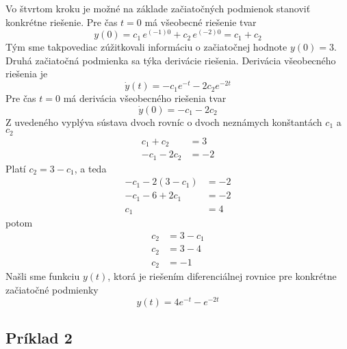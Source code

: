 \documentclass[a4paper, 10pt, ]{article}
\begin{document}
Vo štvrtom kroku je možné na základe začiatočných podmienok stanoviť konkrétne riešenie. Pre čas $t = 0$ má všeobecné riešenie tvar
\begin{equation}
    y(0)  = c_1 \, e^{(-1) 0} + c_2 \, e^{(-2) 0} = c_1 + c_2
\end{equation}
Tým sme takpovediac zúžitkovali informáciu o začiatočnej hodnote $y(0) = 3$. Druhá začiatočná podmienka sa týka derivácie riešenia. Derivácia všeobecného riešenia je
\begin{equation}
    \dot y(t) = - c_1 e^{-t} - 2 c_2 e^{-2t}
\end{equation}
Pre čas $t = 0$ má derivácia všeobecného riešenia tvar
\begin{equation}
    \dot y(0)  = - c_1 - 2 c_2
\end{equation}
Z uvedeného vyplýva sústava dvoch rovníc o dvoch neznámych konštantách $c_1$ a $c_2$
\begin{subequations}
    \begin{align}
        c_1 + c_2 &= 3 \\
        - c_1 - 2 c_2 &= -2
    \end{align}
\end{subequations}
Platí $c_2 = 3-c_1$, a teda
\begin{subequations}
    \begin{align}
        - c_1 - 2 (3 - c_1) &= -2 \\
        - c_1 - 6 + 2 c_1 &= -2 \\
        c_1 &= 4
    \end{align}
\end{subequations}
potom
\begin{subequations}
    \begin{align}
        c_2 &= 3 - c_1 \\
        c_2 &= 3 - 4 \\
        c_2 &= -1
    \end{align}
\end{subequations}
Našli sme funkciu $y(t)$, ktorá je riešením diferenciálnej rovnice pre konkrétne začiatočné podmienky
\begin{equation}
    y(t) = 4 e^{-t} - e^{-2t}
\end{equation}





\subsection{Príklad 2}
\end{document}
